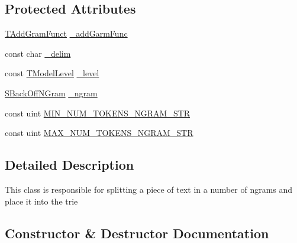 \subsection*{Protected Attributes}
\begin{DoxyCompactItemize}
\item 
\hyperlink{namespaceuva_1_1smt_1_1tries_1_1arpa_a16805e23db5ab5a826e46ae4a59a0a71}{T\+Add\+Gram\+Funct} \hyperlink{classuva_1_1smt_1_1tries_1_1arpa_1_1_a_r_p_a_gram_builder_aff22fce8a9b8b5f00e5d9fcad4dd218c}{\+\_\+add\+Garm\+Func}
\item 
const char \hyperlink{classuva_1_1smt_1_1tries_1_1arpa_1_1_a_r_p_a_gram_builder_a21ec180396f89d3a252fdd750217c2b7}{\+\_\+delim}
\item 
const \hyperlink{namespaceuva_1_1smt_1_1tries_a26064146e98856c7c4185efab0e61a36}{T\+Model\+Level} \hyperlink{classuva_1_1smt_1_1tries_1_1arpa_1_1_a_r_p_a_gram_builder_a333c47efee11f1812378325732d0e43c}{\+\_\+level}
\item 
\hyperlink{structuva_1_1smt_1_1tries_1_1_s_back_off_n_gram}{S\+Back\+Off\+N\+Gram} \hyperlink{classuva_1_1smt_1_1tries_1_1arpa_1_1_a_r_p_a_gram_builder_adcf89e815cdffc79ada87f33d8ebfb74}{\+\_\+ngram}
\item 
const uint \hyperlink{classuva_1_1smt_1_1tries_1_1arpa_1_1_a_r_p_a_gram_builder_a6ab807fa7fd956beabb58d8f275050d0}{M\+I\+N\+\_\+\+N\+U\+M\+\_\+\+T\+O\+K\+E\+N\+S\+\_\+\+N\+G\+R\+A\+M\+\_\+\+S\+T\+R}
\item 
const uint \hyperlink{classuva_1_1smt_1_1tries_1_1arpa_1_1_a_r_p_a_gram_builder_afd40395f976805a4835bc0b03e26cee2}{M\+A\+X\+\_\+\+N\+U\+M\+\_\+\+T\+O\+K\+E\+N\+S\+\_\+\+N\+G\+R\+A\+M\+\_\+\+S\+T\+R}
\end{DoxyCompactItemize}


\subsection{Detailed Description}
This class is responsible for splitting a piece of text in a number of ngrams and place it into the trie 

\subsection{Constructor \& Destructor Documentation}
\hypertarget{classuva_1_1smt_1_1tries_1_1arpa_1_1_a_r_p_a_gram_builder_aabc607c9ba43ff636456b23cb8236e60}{}
